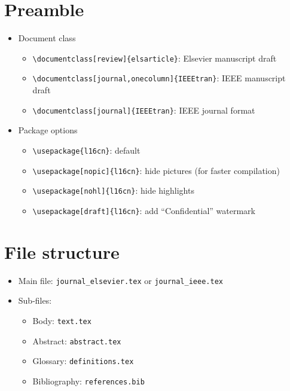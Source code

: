 
\section{Preamble}
\begin{itemize}
	\item Document class
	\begin{itemize}
		\item \verb|\documentclass[review]{elsarticle}|: Elsevier manuscript draft
		\item \verb|\documentclass[journal,onecolumn]{IEEEtran}|: IEEE manuscript draft
		\item \verb|\documentclass[journal]{IEEEtran}|: IEEE journal format
	\end{itemize}
	\item Package options
	\begin{itemize}
		\item \verb|\usepackage{l16cn}|: default
		\item \verb|\usepackage[nopic]{l16cn}|: hide pictures (for faster compilation)
		\item \verb|\usepackage[nohl]{l16cn}|: hide highlights
		\item \verb|\usepackage[draft]{l16cn}|: add ``Confidential'' watermark
	\end{itemize}	
\end{itemize}

\section{File structure}
\begin{itemize}
	\item Main file: \verb|journal_elsevier.tex| or \verb|journal_ieee.tex|
	\item Sub-files:
	\begin{itemize}
		\item Body: \verb|text.tex|
		\item Abstract: \verb|abstract.tex|
		\item Glossary: \verb|definitions.tex|
		\item Bibliography: \verb|references.bib|
	\end{itemize}
\end{itemize}

